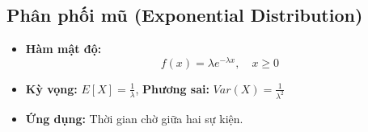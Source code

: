 \subsection{Phân phối mũ (Exponential Distribution)}
\begin{itemize}
    \item \textbf{Hàm mật độ:}
    \[
        f(x) = \lambda e^{-\lambda x}, \quad x \ge 0
    \]
    \item \textbf{Kỳ vọng:} $E[X] = \frac{1}{\lambda}$, \textbf{Phương sai:} $Var(X) = \frac{1}{\lambda^2}$
    \item \textbf{Ứng dụng:} Thời gian chờ giữa hai sự kiện.
\end{itemize}